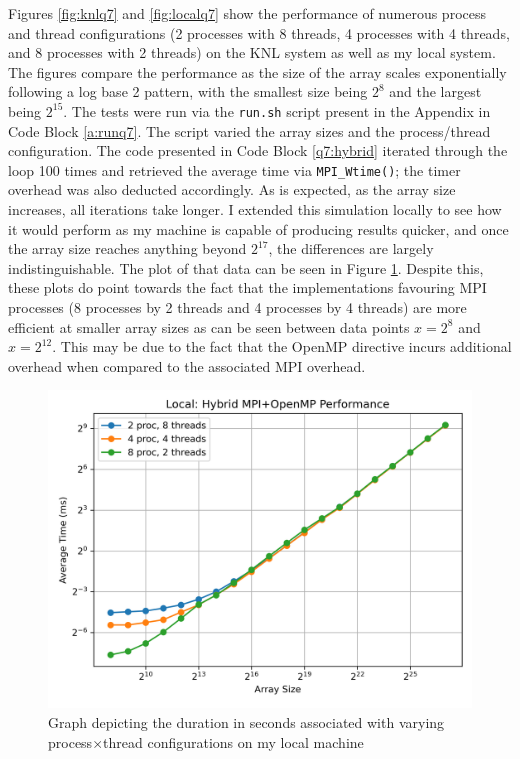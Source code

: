 \documentclass[11pt]{article}
\begin{document}
Figures \ref{fig:knlq7} and \ref{fig:localq7} show the performance of numerous process and thread configurations (2 processes with 8 threads, 4 processes with 4 threads, and 8 processes with 2 threads) on the KNL system as well as my local system.
The figures compare the performance as the size of the array scales exponentially following a log base 2 pattern, with the smallest size being $2^8$ and the largest being $2^{15}$.
The tests were run via the \texttt{run.sh} script present in the Appendix in Code Block \ref{a:runq7}.
The script varied the array sizes and the process/thread configuration.
The code presented in Code Block \ref{q7:hybrid} iterated through the loop 100 times and retrieved the average time via \texttt{MPI\_Wtime()}; the timer overhead was also deducted accordingly.
As is expected, as the array size increases, all iterations take longer.
I extended this simulation locally to see how it would perform as my machine is capable of producing results quicker, and once the array size reaches anything beyond $2^{17}$, the differences are largely indistinguishable.
The plot of that data can be seen in Figure \ref{fig:bigq7}.
Despite this, these plots do point towards the fact that the implementations favouring MPI processes (8 processes by 2 threads and 4 processes by 4 threads) are more efficient at smaller array sizes as can be seen between data points $x=2^8$ and $x=2^{12}$.
This may be due to the fact that the OpenMP directive incurs additional overhead when compared to the associated MPI overhead.

\begin{figure}
\centering
    \includegraphics[width=\textwidth]{./images/bigq7.png}
\caption{Graph depicting the duration in seconds associated with varying process$\times$thread configurations on my local machine}
\label{fig:bigq7}
\end{figure}
\end{document}
